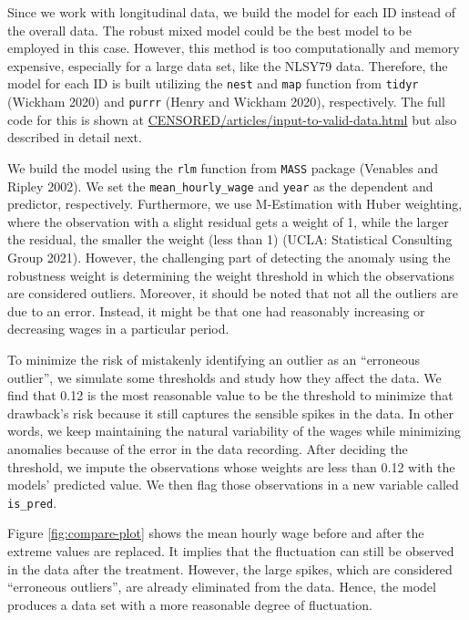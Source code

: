 \documentclass{article}
\begin{document}
Since we work with longitudinal data, we build the model for each ID instead of the overall data. The robust mixed model could be the best model to be employed in this case. However, this method is too computationally and memory expensive, especially for a large data set, like the NLSY79 data. Therefore, the model for each ID is built utilizing the \texttt{nest} and \texttt{map} function from \texttt{tidyr} (Wickham 2020) and \texttt{purrr} (Henry and Wickham 2020), respectively. The full code for this is shown at \url{CENSORED/articles/input-to-valid-data.html} but also described in detail next.

We build the model using the \texttt{rlm} function from \texttt{MASS} package (Venables and Ripley 2002). We set the \texttt{mean\_hourly\_wage} and \texttt{year} as the dependent and predictor, respectively. Furthermore, we use M-Estimation with Huber weighting, where the observation with a slight residual gets a weight of 1, while the larger the residual, the smaller the weight (less than 1) (UCLA: Statistical Consulting Group 2021). However, the challenging part of detecting the anomaly using the robustness weight is determining the weight threshold in which the observations are considered outliers. Moreover, it should be noted that not all the outliers are due to an error. Instead, it might be that one had reasonably increasing or decreasing wages in a particular period.

To minimize the risk of mistakenly identifying an outlier as an ``erroneous outlier'', we simulate some thresholds and study how they affect the data. We find that 0.12 is the most reasonable value to be the threshold to minimize that drawback's risk because it still captures the sensible spikes in the data. In other words, we keep maintaining the natural variability of the wages while minimizing anomalies because of the error in the data recording. After deciding the threshold, we impute the observations whose weights are less than 0.12 with the models' predicted value. We then flag those observations in a new variable called \texttt{is\_pred}.

Figure \ref{fig:compare-plot} shows the mean hourly wage before and after the extreme values are replaced. It implies that the fluctuation can still be observed in the data after the treatment. However, the large spikes, which are considered ``erroneous outliers'', are already eliminated from the data. Hence, the model produces a data set with a more reasonable degree of fluctuation.
\end{document}
